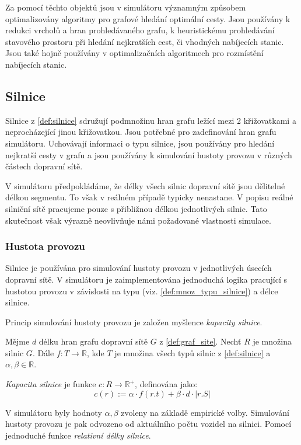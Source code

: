 Za pomocí těchto objektů jsou v simulátoru významným způsobem optimalizovány
algoritmy pro grafové hledání optimální cesty. Jsou používány k redukci vrcholů
a hran prohledávaného grafu, k heuristickému prohledávání stavového prostoru
při hledání nejkratších cest, či vhodných nabíjecích stanic. Jsou také hojně
používány v optimalizačních algoritmech pro rozmístění nabíjecích stanic.


\subsection{Silnice}

Silnice z \cref{def:silnice} sdružují podmnožinu hran grafu ležící mezi
2 křižovatkami a neprocházející jinou křižovatkou. Jsou potřebné pro 
zadefinování hran grafu simulátoru. Uchovávají informaci
o typu silnice, jsou používány pro hledání nejkratší cesty v grafu a jsou 
používány k simulování hustoty provozu v různých částech dopravní sítě.

V simulátoru předpokládáme, že délky všech silnic dopravní sítě jsou 
dělitelné délkou segmentu. To však v reálném případě typicky nenastane. V 
popisu reálné silniční sítě pracujeme pouze s přibližnou délkou jednotlivých
silnic. Tato skutečnost však výrazně neovlivňuje námi požadované vlastnosti
simulace.

\subsubsection{Hustota provozu}
Silnice je používána pro simulování hustoty provozu v jednotlivých úsecích dopravní
sítě. V simulátoru je zaimplementována jednoduchá logika pracující s hustotou
provozu v závislosti na typu (viz. \cref{def:mnoz_typu_silnice}) a délce 
silnice.

Princip simulování hustoty provozu je založen myšlence \emph{kapacity silnice}.

\begin{defn}\label{def:kapacita_silnice}
    Mějme $d$ délku hran grafu dopravní sítě $G$ z \cref{def:graf_site}.
    Nechť $R$ je množina silnic $G$. Dále $f:T \to \mathbb{R}$, kde $T$ je 
    množina všech typů silnic z \cref{def:silnice} a $\alpha, \beta \in \mathbb{R}$.

    \emph{Kapacita silnice} je funkce $c:R \to \mathbb{R}^+$, definována jako:
        $$c(r) := \alpha \cdot f(r.t) + \beta \cdot d \cdot |r.S|$$
\end{defn}

V simulátoru byly hodnoty $\alpha, \beta$ zvoleny na základě empirické volby. 
Simulování hustoty provozu je pak odvozeno od aktuálního počtu vozidel na 
silnici. Pomocí jednoduché funkce \emph{relativní délky silnice}.
 
